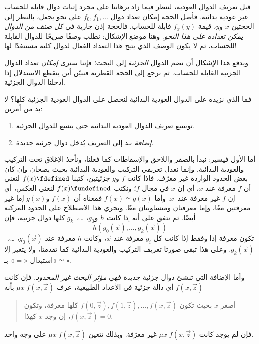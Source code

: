 \documentclass[../../../include/open-logic-section]{subfiles}
\begin{document}

قبل تعريف الدوال العودية، لننظر فيما زاد برهاننا على مجرد إثبات دوال قابلة
للحساب غير عودية بدائية. فأصل الحجة
إمكان تعداد دوال $f_0,f_1,\dots$ على نحو يجعل،
بالنظر إلى الحجتين $x$ و$y$، قيمة $f_x(y)$ قابلة للحساب. فالحجة إذن جارية في
\emph{كل صنف من الدوال يمكن تعداده على هذا النحو}. وهنا
موضع الإشكال: نطلب وصفًا صريحًا للدوال القابلة للحساب، ثم لا يكون الوصف
الذي يتيح هذا التعداد الفعال لدوال كلية مستنفدًا لها!

ويدفع هذا الإشكال أن نضم الدوال \emph{الجزئية} إلى البحث؛ فإننا سنرى
\emph{إمكان} تعداد الدوال الجزئية القابلة للحساب.
 ثم نرجع إلى الحجة القطرية
فنبيّن أين ينقطع الاستدلال إذا أدخلنا الدوال الجزئية.

فما الذي نزيده على الدوال العودية البدائية لنحصل
على الدوال العودية الجزئية كلها؟ لا بد من أمرين:
\begin{enumerate}
\item توسيع تعريف الدوال العودية البدائية حتى يتسع للدوال الجزئية.
\item \emph{إضافة} بند إلى التعريف يُدخل دوال جزئية
جديدة.
\end{enumerate}

أما الأول فيسير: نبدأ بالصفر واللاحق والإسقاطات كما فعلنا، ونأخذ الإغلاق تحت
التركيب والعودية البدائية. وإنما نعدل تعريفي التركيب
والعودية البدائية بحيث يصحان وإن كان بعض الحدود الواردة غير معرّف.
فإذا كانت $f$ و$g$ جزئيتين، كتبنا $f(x)\fdefined$ لنعني أن
$f$ معرفة عند $x$، أي إن $x$ في مجال $f$؛ ونكتب
$f(x)\fundefined$ لنعني العكس، أي إن $f$ غير معرفة عند~$x$.
وأما $f(x)\simeq g(x)$ فمعناه أن $f(x)$ و$g(x)$ إما غير معرفتين
معًا، وإما معرفتان ومتساويتان معًا. ويجري هذا الاصطلاح على الحدود
المركبة أيضًا. ثم نتفق على أنه إذا كانت $h$ و$g_0$،
…،~$g_k$ كلها دوال جزئية، فإن
\[
h(g_0(\vec x),\dots,g_k(\vec x))
\]
تكون معرفة إذا وفقط إذا كانت كل $g_i$ معرفة عند $\vec x$، وكانت $h$
معرفة عند $g_0(\vec x)$، …،~$g_k(\vec x)$. وعلى هذا تبقى صورتا تعريف
التركيب والعودية البدائية كما تقدمتا، ولا يتغير إلا
استبدال «$=$» بـ«$\simeq$».

وأما الإضافة التي تنشئ دوال جزئية جديدة فهي
\emph{مؤثر البحث غير المحدود}. فإن كانت $f(x,\vec z)$ أي دالة جزئية
في الأعداد الطبيعية، عرف $\mu x\;f(x,\vec z)$ بأنه
\begin{quote}
  أصغر $x$ بحيث تكون $f(0,\vec z), f(1,\vec z), \dots, f(x,\vec z)$
  كلها معرفة، وتكون $f(x,\vec z)=0$، إن وجد $x$ كهذا.
\end{quote}
فإن لم يوجد كانت $\mu x\;f(x,\vec z)$ غير معرّفة. وبذلك تتعين
$\mu x\;f(x,\vec z)$ على وجه واحد.
\end{document}
